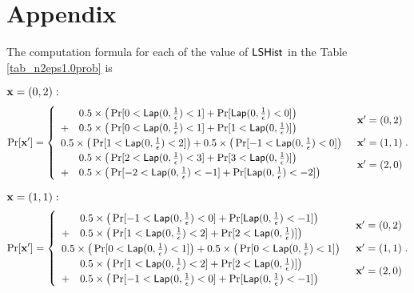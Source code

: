 \documentclass{article}
\begin{document}
{\clearpage

\section*{Appendix}
The computation formula for each of the value of $\mathsf{LSHist}$ in the Table \ref{tab_n2eps1.0prob} is

{\scriptsize
\noindent $\textbf{x} = (0,2):$
\[
\Pr[\textbf{x}']
= \begin{cases}
\begin{array}{ll}
 	& 0.5 \times 
 	\big(
 	\Pr[	0	< \mathsf{Lap}(0, \frac{1}{\epsilon})	<	1] 
 	+ 
 	\Pr[	\mathsf{Lap}(0, \frac{1}{\epsilon})			<	0] 
 	\big) \\
 	+ 	
 	& 0.5 \times 
 	\big(
 	\Pr[	0	< \mathsf{Lap}(0, \frac{1}{\epsilon})	<	1] 
 	+ 
 	\Pr[	1 	< \mathsf{Lap}(0, \frac{1}{\epsilon})] 
 	\big) 
\end{array} 
	& \textbf{x}' = (0, 2)\\
\begin{array}{ll}
 	0.5 \times 
 	\big(
 	\Pr[	1	< \mathsf{Lap}(0, \frac{1}{\epsilon})	<	2] 
 	\big)
 	+ 	
 	0.5 \times 
 	\big(
 	\Pr[	-1	< \mathsf{Lap}(0, \frac{1}{\epsilon})	<	0] 
 	\big) 
\end{array}  
	& \textbf{x}' = (1, 1)\\
\begin{array}{ll}
 	& 0.5 \times 
 	\big(
 	\Pr[	2	<	\mathsf{Lap}(0, \frac{1}{\epsilon})	<	3] 
 	+ 
 	\Pr[	3	<	\mathsf{Lap}(0, \frac{1}{\epsilon})]
 	\big) \\
 	+ 	
 	& 0.5 \times 
 	\big(
 	\Pr[	-2	< \mathsf{Lap}(0, \frac{1}{\epsilon})	<	-1] 
 	+ 
 	\Pr[	\mathsf{Lap}(0, \frac{1}{\epsilon})			<	-2] 
 	\big) 
\end{array}  
& \textbf{x}' = (2, 0)
\end{cases}.
\]


\noindent $\textbf{x} = (1,1):$
\[
\Pr[\textbf{x}']
= \begin{cases}
\begin{array}{ll}
 	& 0.5 \times 
 	\big(
 	\Pr[	-1	< \mathsf{Lap}(0, \frac{1}{\epsilon})	<	0] 
 	+ 
 	\Pr[	\mathsf{Lap}(0, \frac{1}{\epsilon})			<	-1] 
 	\big) \\
 	+ 	
 	& 0.5 \times 
 	\big(
 	\Pr[	1	< \mathsf{Lap}(0, \frac{1}{\epsilon})	<	2] 
 	+ 
 	\Pr[	2 	< \mathsf{Lap}(0, \frac{1}{\epsilon})] 
 	\big) 
\end{array} 
	& \textbf{x}' = (0, 2)\\
\begin{array}{ll}
 	0.5 \times 
 	\big(
 	\Pr[	0	< \mathsf{Lap}(0, \frac{1}{\epsilon})	<	1] 
 	\big)
 	+ 	
 	0.5 \times 
 	\big(
 	\Pr[	0	< \mathsf{Lap}(0, \frac{1}{\epsilon})	<	1] 
 	\big) 
\end{array}  
	& \textbf{x}' = (1, 1)\\
\begin{array}{ll}
 	& 0.5 \times 
 	\big(
 	\Pr[	1	<	\mathsf{Lap}(0, \frac{1}{\epsilon})	<	2] 
 	+ 
 	\Pr[	2	<	\mathsf{Lap}(0, \frac{1}{\epsilon})]
 	\big) \\
 	+ 	
 	& 0.5 \times 
 	\big(
 	\Pr[	-1	< \mathsf{Lap}(0, \frac{1}{\epsilon})	<	0] 
 	+ 
 	\Pr[	\mathsf{Lap}(0, \frac{1}{\epsilon})			<	-1] 
 	\big) 
\end{array}  
& \textbf{x}' = (2, 0)
\end{cases}.
\]

}}
\end{document}
